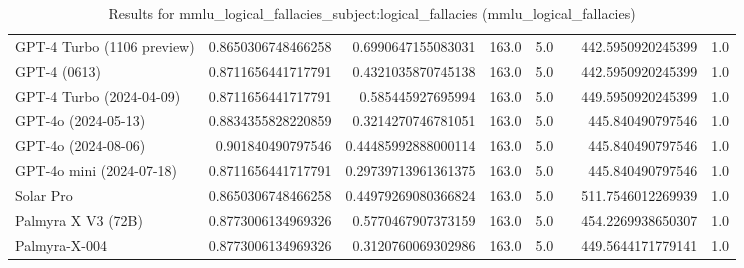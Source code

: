 \begin{table}[htp]
{\begin{tabular}{lrrrrrrr}
GPT-4 Turbo (1106 preview) & 0.8650306748466258 & 0.6990647155083031 & 163.0 & 5.0 &  & 442.5950920245399 & 1.0 \\
GPT-4 (0613) & 0.8711656441717791 & 0.4321035870745138 & 163.0 & 5.0 &  & 442.5950920245399 & 1.0 \\
GPT-4 Turbo (2024-04-09) & 0.8711656441717791 & 0.585445927695994 & 163.0 & 5.0 &  & 449.5950920245399 & 1.0 \\
GPT-4o (2024-05-13) & 0.8834355828220859 & 0.3214270746781051 & 163.0 & 5.0 &  & 445.840490797546 & 1.0 \\
GPT-4o (2024-08-06) & 0.901840490797546 & 0.44485992888000114 & 163.0 & 5.0 &  & 445.840490797546 & 1.0 \\
GPT-4o mini (2024-07-18) & 0.8711656441717791 & 0.29739713961361375 & 163.0 & 5.0 &  & 445.840490797546 & 1.0 \\
Solar Pro & 0.8650306748466258 & 0.44979269080366824 & 163.0 & 5.0 &  & 511.7546012269939 & 1.0 \\
Palmyra X V3 (72B) & 0.8773006134969326 & 0.5770467907373159 & 163.0 & 5.0 &  & 454.2269938650307 & 1.0 \\
Palmyra-X-004 & 0.8773006134969326 & 0.3120760069302986 & 163.0 & 5.0 &  & 449.5644171779141 & 1.0 \\
\bottomrule
\end{tabular}}
\caption{Results for mmlu_logical_fallacies_subject:logical_fallacies (mmlu_logical_fallacies)}
\label{fig:mmlu_logical_fallacies_subject:logical_fallacies (mmlu_logical_fallacies)}
\end{table}